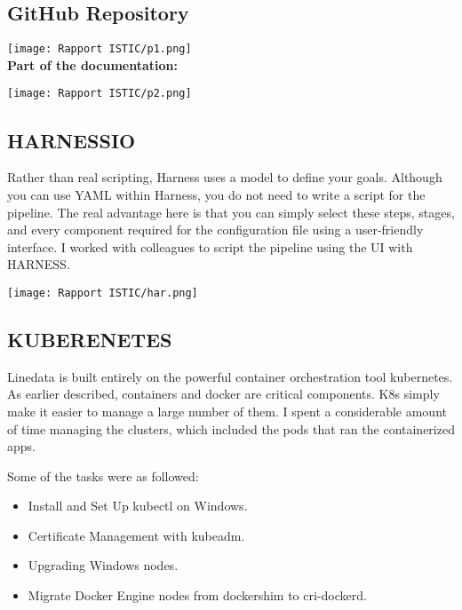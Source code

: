 \subsection{GitHub Repository}

\texttt{[image: Rapport ISTIC/p1.png]}\\
\newline
\textbf{Part of the documentation:}\newline

\texttt{[image: Rapport ISTIC/p2.png]}\\

\subsection{HARNESSIO}
Rather than real scripting, Harness uses a model to define your goals. Although you can use YAML within Harness, you do not need to write a script for the pipeline. The real advantage here is that you can simply select these steps, stages, and every component required for the configuration file using a user-friendly interface. I worked with colleagues to script the pipeline using the UI with HARNESS.\newline

\texttt{[image: Rapport ISTIC/har.png]}\\

\subsection{KUBERENETES}

Linedata is built entirely on the powerful container orchestration tool kubernetes. As earlier described, containers and docker are critical components. K8s simply make it easier to manage a large number of them. I spent a considerable amount of time managing the clusters, which included the pods that ran the containerized apps.\newline

Some of the tasks were as followed:
\begin{itemize}
  \item Install and Set Up kubectl on Windows.
  \item Certificate Management with kubeadm.
  \item Upgrading Windows nodes.
  \item Migrate Docker Engine nodes from dockershim to cri-dockerd.

\end{itemize}